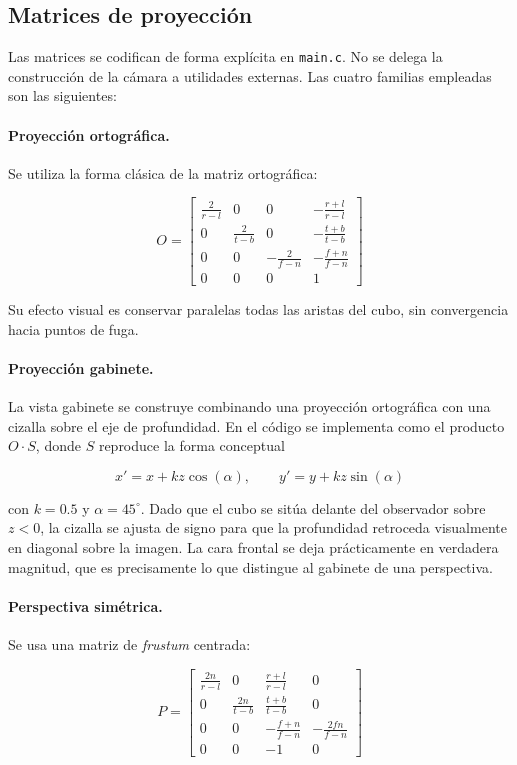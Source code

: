 \documentclass[12pt,a4paper]{article}
\begin{document}
\subsection{Matrices de proyección}
Las matrices se codifican de forma explícita en \texttt{main.c}. No se delega la construcción de la cámara a utilidades externas. Las cuatro familias empleadas son las siguientes:

\paragraph{Proyección ortográfica.}
Se utiliza la forma clásica de la matriz ortográfica:

\[
O =
\begin{bmatrix}
\frac{2}{r-l} & 0 & 0 & -\frac{r+l}{r-l} \\
0 & \frac{2}{t-b} & 0 & -\frac{t+b}{t-b} \\
0 & 0 & -\frac{2}{f-n} & -\frac{f+n}{f-n} \\
0 & 0 & 0 & 1
\end{bmatrix}
\]

Su efecto visual es conservar paralelas todas las aristas del cubo, sin convergencia hacia puntos de fuga.

\paragraph{Proyección gabinete.}
La vista gabinete se construye combinando una proyección ortográfica con una cizalla sobre el eje de profundidad. En el código se implementa como el producto $O \cdot S$, donde $S$ reproduce la forma conceptual

\[
x' = x + k z \cos(\alpha), \qquad y' = y + k z \sin(\alpha)
\]

con $k = 0.5$ y $\alpha = 45^\circ$. Dado que el cubo se sitúa delante del observador sobre $z < 0$, la cizalla se ajusta de signo para que la profundidad retroceda visualmente en diagonal sobre la imagen. La cara frontal se deja prácticamente en verdadera magnitud, que es precisamente lo que distingue al gabinete de una perspectiva.

\paragraph{Perspectiva simétrica.}
Se usa una matriz de \emph{frustum} centrada:

\[
P =
\begin{bmatrix}
\frac{2n}{r-l} & 0 & \frac{r+l}{r-l} & 0 \\
0 & \frac{2n}{t-b} & \frac{t+b}{t-b} & 0 \\
0 & 0 & -\frac{f+n}{f-n} & -\frac{2fn}{f-n} \\
0 & 0 & -1 & 0
\end{bmatrix}
\]
\end{document}
